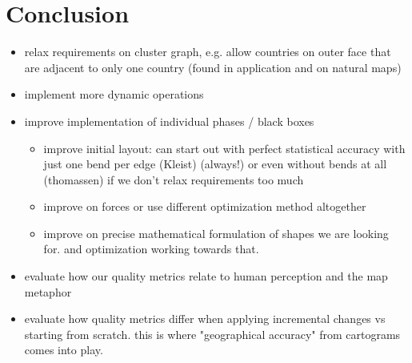 \chapter{Conclusion}
\label{chap:conclusion}

\begin{itemize}
	\item relax requirements on cluster graph, e.g. allow countries on outer face that are adjacent to only one country (found in application and on natural maps)
	\item implement more dynamic operations
	\item improve implementation of individual phases / black boxes \begin{itemize}
		\item improve initial layout: can start out with perfect statistical accuracy with just one bend per edge (Kleist) (always!) or even without bends at all (thomassen) if we don't relax requirements too much
		\item improve on forces or use different optimization method altogether
		\item improve on precise mathematical formulation of shapes we are looking for. and optimization working towards that.
	\end{itemize}
	\item evaluate how our quality metrics relate to human perception and the map metaphor
	\item evaluate how quality metrics differ when applying incremental changes vs starting from scratch. this is where "geographical accuracy" from cartograms comes into play.
\end{itemize}


